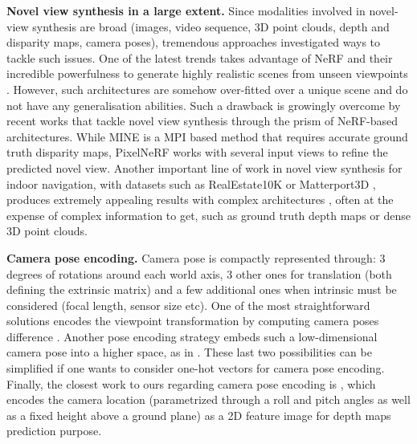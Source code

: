 \noindent\textbf{Novel view synthesis in a large extent.} Since modalities involved in novel-view synthesis are broad (images, video sequence, 3D point clouds, depth and disparity maps, camera poses), tremendous approaches investigated ways to tackle such issues. One of the latest trends takes advantage of \ac{NeRF} \citep{mildenhall2020nerf} and their incredible powerfulness to generate highly realistic scenes from unseen viewpoints \citep{wang2021neus,niemeyer2022regnerf,barron2022mip}. However, such architectures are somehow over-fitted over a unique scene and do not have any generalisation abilities. Such a drawback is growingly overcome by recent works \citep{yu2021pixelnerf,li2021mine} that tackle novel view synthesis through the prism of NeRF-based architectures. While MINE \citep{li2021mine} is a \ac{MPI} based method that requires accurate ground truth disparity maps, PixelNeRF \citep{yu2021pixelnerf} works with several input views to refine the predicted novel view. Another important line of work in novel view synthesis for indoor navigation, with datasets such as RealEstate10K \citep{zhou2018stereo} or Matterport3D \citep{zhao2021camera}, produces extremely appealing results with complex architectures \citep{wiles2020synsin,rombach2021geometry,rockwell2021pixelsynth}, often at the expense of complex information to get, such as ground truth depth maps or dense 3D point clouds. \newline

\noindent\textbf{Camera pose encoding.} Camera pose is compactly represented through: 3 degrees of rotations around each world axis, 3 other ones for translation (both defining the extrinsic matrix) and a few additional ones when intrinsic must be considered (focal length, sensor size etc). One of the most straightforward solutions encodes the viewpoint transformation by computing camera poses difference \citep{sun2018multiview}. Another pose encoding strategy embeds such a low-dimensional camera pose into a higher space, as in \citep{kim2020novel,rombach2021geometry}. These last two possibilities can be simplified if one wants to consider one-hot vectors for camera pose encoding. Finally, the closest work to ours regarding camera pose encoding is \citep{zhao2021camera}, which encodes the camera location (parametrized through a roll and pitch angles as well as a fixed height above a ground plane) as a 2D feature image for depth maps prediction purpose. \newline

